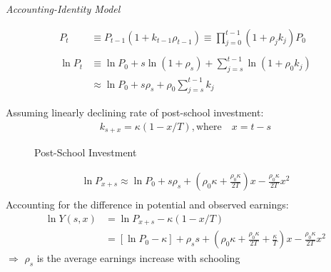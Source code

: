 \begin{frame}\begin{center}
\LARGE\textit{Accounting-Identity Model}
\end{center}\end{frame}

\begin{frame}
\begin{align*}
P_t & \equiv P_{t - 1} (1 + k_{t - 1} \rho_{t - 1}) \equiv \prod^{t - 1}_{j= 0} (1 + \rho_jk_j)P_0 \\
& \\
\ln{P_t} & \equiv \ln{P_0}  + s \ln{(1 + \rho_s)} + \sum^{t-1}_{j=s} \ln{(1 + \rho_0 k_j)} \\
& \approx  \ln{P_0} + s \rho_s + \rho_0 \sum^{t - 1}_{j=s} k_j
\end{align*}
\end{frame}



\begin{frame}
Assuming linearly declining rate of post-school investment:
\begin{align*}
k_{s + x} = \kappa\left( 1 - x/T\right),\text{where} \quad x = t - s
\end{align*}
\end{frame}

\begin{frame}
\begin{figure}[htp]\centering
\caption{Post-School Investment}\label{Post-School Investment}
\end{figure}
\end{frame}

\begin{frame}
 \begin{align*}
 \ln{P_{x + s}}  \approx \ln{P_0} + s\rho_s + \left(\rho_0 \kappa + \frac{\rho_0\kappa}{2T}\right)x - \frac{\rho_0\kappa}{2T} x^2 \\
 \end{align*}
Accounting for the difference in potential and observed earnings:
\begin{align*}
\ln{Y(s, x)} & = \ln{P_{x + s}} - \kappa\left(1 - x/T\right) \\
            & = [\ln{P_0} - \kappa] + \rho_s s + \left(\rho_0\kappa + \frac{\rho_0\kappa}{2T} + \frac{\kappa}{T}\right) x - \frac{\rho_0\kappa}{2T}x^2
\end{align*}
$\Rightarrow$ $\rho_s$ is the average earnings increase with schooling
\end{frame}

